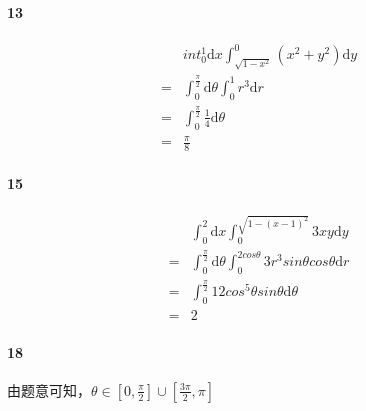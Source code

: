 \documentclass[UTF8]{ctexart}
\begin{document}
\paragraph*{13}
\begin{align*}
    &int_{0}^{1} \mathrm{d}x \int_{\sqrt{1-x^2} }^{0} (x^2 + y^2)\mathrm{d}y \\
    =& \int_{0}^{\frac{\pi}{2} } \mathrm{d}\theta \int_{0}^{1} r^3 \mathrm{d}r \\
    =& \int_{0}^{\frac{\pi}{2} } \frac{1}{4} \mathrm{d}\theta \\
    =& \frac{\pi}{8} 
\end{align*}
\paragraph*{15}
\begin{align*}
    &\int_{0}^{2} \mathrm{d}x \int_{0}^{\sqrt{1-(x-1)^2}}3xy \mathrm{d}y \\
    =& \int_{0}^{\frac{\pi}{2} } \mathrm{d}\theta \int_{0}^{2cos\theta} 3r^3sin\theta cos\theta \mathrm{d}r \\
    =& \int_{0}^{\frac{\pi}{2} }  12cos^5\theta sin\theta \mathrm{d}\theta \\
    =& 2
\end{align*}
\paragraph*{18}
由题意可知，$\theta \in [0, \frac{\pi}{2}]\cup[\frac{3\pi}{2}, \pi]$
\end{document}
